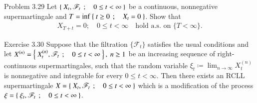 	\begin{itembox}[l]{Problem 3.29}
		Let $\left\{\ X_t,\mathscr{F}_t\ \, ; \quad 0 \leq t < \infty\ \right\}$ be a continuous, nonnegative supermartingale
		and $T = \operatorname*{inf}_{} \left\{\ t \geq 0\ \, ; \quad X_t = 0\ \right\}$. Show that
		\begin{align}
			X_{T + t} = 0; \quad 0 \leq t < \infty \quad \mbox{hold a.s. on $\{T < \infty\}$}.
		\end{align}
	\end{itembox}
	
	\begin{itembox}[l]{Exercise 3.30}
		Suppose that the filtration $\{\mathscr{F}_t\}$ satisfies the usual conditions and let 
		$X^{(n)} = \left\{\ X^{(n)}_t,\mathscr{F}_t\ \, ; \quad 0 \leq t < \infty\ \right\},\ n \geq 1$ be an increasing sequence
		of right-continuous supermartingales, such that the random variable $\xi_t \coloneqq \lim_{n \to \infty} X^{(n)}_t$
		is nonnegative and integrable for every $0 \leq t < \infty$. Then there exists an RCLL supermartingale
		$X = \left\{\ X_t,\mathscr{F}_t\ \, ; \quad 0 \leq t < \infty\ \right\}$ which is a modification of the process 
		$\xi = \left\{\ \xi_t,\mathscr{F}_t\ \, ; \quad 0 \leq t < \infty\ \right\}$.
	\end{itembox}